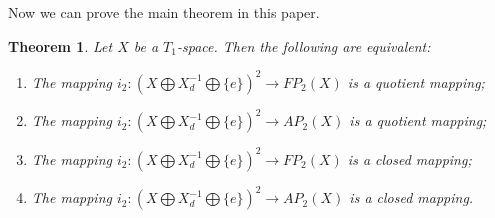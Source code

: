 \documentclass{amsart}
\newtheorem{theorem}{Theorem}[section]
\theoremstyle{definition}
\begin{document}
Now we can prove the main theorem in this paper.

\begin{theorem}\label{t5}
Let $X$ be a $T_{1}$-space. Then the following are equivalent:
\begin{enumerate}
\item The mapping $i_{2}: (X\bigoplus X_{d}^{-1}\bigoplus\{e\})^{2}\longrightarrow FP_{2}(X)$ is a quotient mapping;

\item The mapping $i_{2}: (X\bigoplus X_{d}^{-1}\bigoplus\{e\})^{2}\longrightarrow AP_{2}(X)$ is a quotient mapping;

\item The mapping $i_{2}: (X\bigoplus X_{d}^{-1}\bigoplus\{e\})^{2}\longrightarrow FP_{2}(X)$ is a closed mapping;

\item The mapping $i_{2}: (X\bigoplus X_{d}^{-1}\bigoplus\{e\})^{2}\longrightarrow AP_{2}(X)$ is a closed mapping.
\end{enumerate}
\end{theorem}
\end{document}
